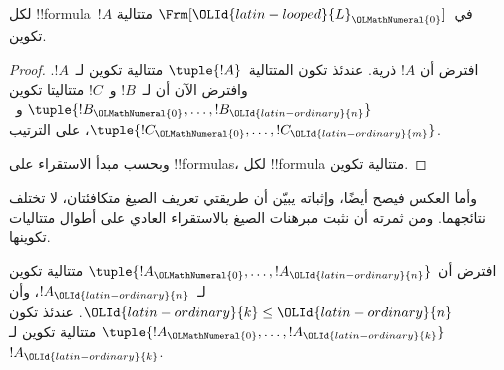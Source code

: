 \documentclass[../../../include/open-logic-section]{subfiles}
\begin{document}
\begin{prop}
لكل !!{formula}~$!A$ في~$\Frm[{\OLId{latin-looped}{L}}_{\OLMathNumeral{0}}]$ متتالية تكوين.
\end{prop}

\begin{proof}
افترض أن $!A$ ذرية. عندئذ تكون المتتالية~$\tuple{!A}$ متتالية
تكوين لـ~$!A$.
%
وافترض الآن أن لـ~$!B$ و~$!C$ متتاليتا تكوين
$\tuple{!B_{\OLMathNumeral{0}},\dotsc,!B_{\OLId{latin-ordinary}{n}}}$ و~$\tuple{!C_{\OLMathNumeral{0}},\dotsc,!C_{\OLId{latin-ordinary}{m}}}$،
على الترتيب.
%
\begin{enumerate}
\end{enumerate}
وبحسب مبدأ الاستقراء على !!{formula}s، لكل
!!{formula} متتالية تكوين.
\end{proof}

وأما العكس فيصح أيضًا، وإثباته يبيّن أن طريقتي تعريف الصيغ متكافئتان، لا تختلف نتائجهما. ومن ثمرته أن نثبت مبرهنات الصيغ بالاستقراء العادي على أطوال متتاليات تكوينها.

\begin{lem}
افترض أن $\tuple{!A_{\OLMathNumeral{0}},\dotsc,!A_{\OLId{latin-ordinary}{n}}}$ متتالية تكوين لـ~$!A_{\OLId{latin-ordinary}{n}}$، وأن
${\OLId{latin-ordinary}{k}} \leq {\OLId{latin-ordinary}{n}}$. عندئذ تكون $\tuple{!A_{\OLMathNumeral{0}},\dotsc,!A_{\OLId{latin-ordinary}{k}}}$ متتالية تكوين
لـ~$!A_{\OLId{latin-ordinary}{k}}$.
\end{lem}
\end{document}
